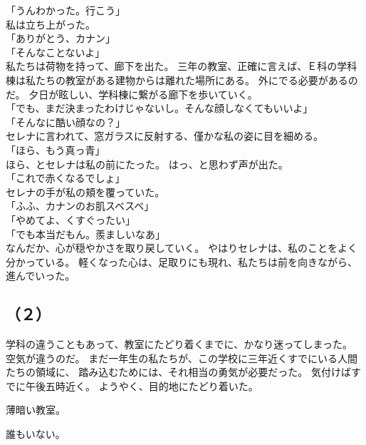 \documentclass[../IHMain]{subfiles}
\begin{document}
「うんわかった。行こう」\\
私は立ち上がった。\\
「ありがとう、カナン」\\
「そんなことないよ」\\
私たちは荷物を持って、廊下を出た。
三年の教室、正確に言えば、Ｅ科の学科棟は私たちの教室がある建物からは離れた場所にある。
外にでる必要があるのだ。
夕日が眩しい、学科棟に繋がる廊下を歩いていく。\\
「でも、まだ決まったわけじゃないし。そんな顔しなくてもいいよ」\\
「そんなに酷い顔なの？」\\
セレナに言われて、窓ガラスに反射する、僅かな私の姿に目を細める。\\
「ほら、もう真っ青」\\
ほら、とセレナは私の前にたった。
はっ、と思わず声が出た。\\
「これで赤くなるでしょ」\\
セレナの手が私の頬を覆っていた。\\
「ふふ、カナンのお肌スベスベ」\\
「やめてよ、くすぐったい」\\
「でも本当だもん。羨ましいなあ」\\
なんだか、心が穏やかさを取り戻していく。
やはりセレナは、私のことをよく分かっている。
軽くなった心は、足取りにも現れ、私たちは前を向きながら、進んでいった。

\subsection*{（２）}

学科の違うこともあって、教室にたどり着くまでに、かなり迷ってしまった。
空気が違うのだ。
まだ一年生の私たちが、この学校に三年近くすでにいる人間たちの領域に、
踏み込むためには、それ相当の勇気が必要だった。
気付けばすでに午後五時近く。
ようやく、目的地にたどり着いた。

薄暗い教室。

誰もいない。
\end{document}
